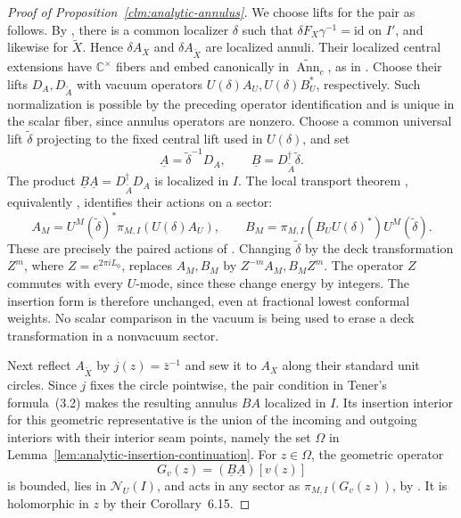\begin{proof}[Proof of Proposition~\ref{clm:analytic-annulus}]
We choose lifts for the pair as follows.  By
\cite[Lemma~3.19 and Corollary~3.20]{TenFields}, there is a common
localizer $\delta$ such that
$\delta F_X\gamma^{-1}=\mathrm{id}$ on $I'$, and likewise for
$\widetilde X$.  Hence $\delta A_X$ and $\delta A_{\widetilde X}$
are localized annuli.  Their localized central extensions have
$\mathbb C^\times$ fibers and embed canonically in
$\widetilde{\operatorname{Ann}}_c$, as in \cite[Section~7]{HTAnn}.
Choose their lifts $D_A,D_{\widetilde A}$ with vacuum operators
$U(\delta)A_U,U(\delta)B_U^*$, respectively.  Such normalization
is possible by the preceding operator identification and is unique
in the scalar fiber, since annulus operators are nonzero.
Choose a common universal lift $\widetilde\delta$ projecting to the
fixed central lift used in $U(\delta)$, and set
\[
 \underline A=\widetilde\delta^{-1}D_A,
 \qquad
 \underline B=D_{\widetilde A}^{\dagger}\widetilde\delta.
\]
The product $\underline B\underline A
=D_{\widetilde A}^{\dagger}D_A$ is localized in $I$.
The local transport theorem \cite[Theorem~7.4]{HTAnn}, equivalently
\cite[Proposition~4.17]{HTNet}, identifies their actions on a sector:
\[
 A_M=U^M(\widetilde\delta)^*\pi_{M,I}(U(\delta)A_U),
 \qquad
 B_M=\pi_{M,I}(B_UU(\delta)^*)U^M(\widetilde\delta).
\]
These are precisely the paired actions of
\cite[Section~5.1, formula~(5.2)]{TenFields}.
Changing $\widetilde\delta$ by the deck transformation
$Z^m$, where $Z=e^{2\pi iL_0}$, replaces $A_M,B_M$ by
$Z^{-m}A_M,B_MZ^m$.  The operator $Z$ commutes with every
$U$-mode, since these change energy by integers.  The insertion form
is therefore unchanged, even at fractional lowest conformal weights.
No scalar comparison in the vacuum is being used to erase a deck
transformation in a nonvacuum sector.

Next reflect $A_{\widetilde X}$ by $j(z)=\bar z^{-1}$ and sew it
to $A_X$ along their standard unit circles.  Since $j$ fixes the
circle pointwise, the pair condition in Tener's formula~(3.2) makes
the resulting annulus $BA$ localized in $I$.  Its insertion interior
for this geometric representative is the union of the incoming and
outgoing interiors with their
interior seam points, namely the set $\Omega$ in
Lemma~\ref{lem:analytic-insertion-continuation}.
For $z\in\Omega$, the geometric operator
\[
 G_v(z)=(\underline B\underline A)[v(z)]
\]
is bounded, lies in $\mathcal N_U(I)$, and acts in any sector as
$\pi_{M,I}(G_v(z))$, by \cite[Lemma~6.8]{HTNet}.
It is holomorphic in $z$ by their Corollary~6.15.


\end{proof}
